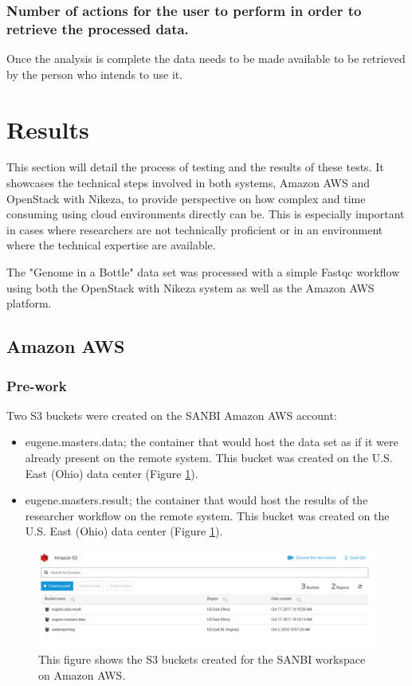 \subsubsection{Number of actions for the user to perform in order to retrieve the processed data.}
Once the analysis is complete the data needs to be made available to be retrieved by the person who intends to use it.

\section{Results}
This section will detail the process of testing and the results of these tests. It showcases the technical steps involved in both systems, Amazon AWS and OpenStack with Nikeza, to provide perspective on how complex and time consuming using cloud environments directly can be. This is especially important in cases where researchers are not technically proficient or in an environment where the technical expertise are available.

The "Genome in a Bottle" data set was processed with a simple Fastqc workflow using both the OpenStack with Nikeza system as well as the Amazon AWS platform. 

\subsection{Amazon AWS}

\subsubsection{Pre-work}

Two S3 buckets were created on the SANBI Amazon AWS account:

\begin{itemize}
    \item eugene.masters.data; the container that would host the data set as if it were already present on the remote system. This bucket was created on the U.S. East (Ohio) data center (Figure \ref{fig:s3_buckets}).
    \item eugene.masters.result; the container that would host the results of the researcher workflow on the remote system. This bucket was created on the U.S. East (Ohio) data center (Figure \ref{fig:s3_buckets}).
\end{itemize}

\begin{figure}[h!]
\centering
\includegraphics[width=\textwidth]{Figures/4_s3_buckets.png}
\decoRule
\caption[AWS S3 Buckets for Testing]{This figure shows the S3 buckets created for the SANBI workspace on Amazon AWS.}
\label{fig:s3_buckets}
\end{figure}

